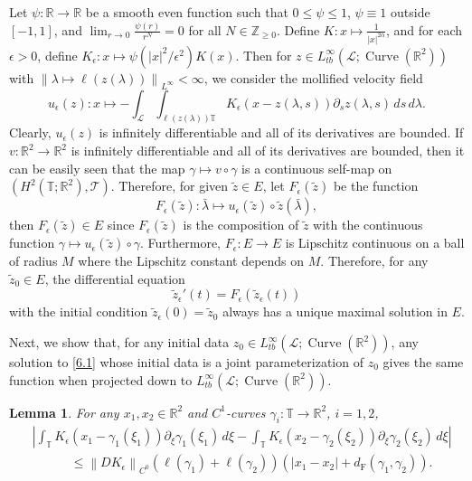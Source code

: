 \documentclass[reqno,centertags,12pt]{amsart}
\newtheorem{lemma}[theorem]{Lemma}
\theoremstyle{definition}
\numberwithin{equation}{section}
\newcommand{\abs}[1]{\left\lvert#1\right\rvert}
\newcommand{\norm}[1]{\left\|#1\right\|}
\newcommand{\bbR}{{\mathbb{R}}}
\newcommand{\bbZ}{{\mathbb{Z}}}
\newcommand{\bbT}{{\mathbb{T}}}
\begin{document}
Let $\psi\colon\bbR\to\bbR$ be a smooth even function such that $0\leq\psi\leq 1$,
$\psi\equiv 1$ outside $[-1,1]$, and $\lim_{r\to 0}\frac{\psi(r)}{r^{N}} = 0$
for all $N\in\bbZ_{\geq 0}$. Define $K\colon x\mapsto \frac{1}{\abs{x}^{2\alpha}}$,
and for each $\epsilon>0$, define
$K_{\epsilon}\colon x\mapsto \psi(\abs{x}^{2}/\epsilon^{2})K(x)$.
Then for $z\in L_{tb}^{\infty}(\mathcal{L};\operatorname{Curve}(\bbR^{2}))$
with $\norm{\lambda\mapsto\ell(z(\lambda))}_{L^{\infty}} < \infty$,
we consider the mollified velocity field
\[
    u_{\epsilon}(z) \colon x \mapsto
    - \int_{\mathcal{L}}\int_{\ell(z(\lambda))\bbT}
    K_{\epsilon}(x - z(\lambda,s))
    \partial_{s}z(\lambda,s)
    \,ds\,d\lambda.
\]
Clearly, $u_{\epsilon}(z)$ is infinitely differentiable and all of its derivatives
are bounded. If $v\colon\bbR^{2}\to\bbR^{2}$ is infinitely differentiable and all of its
derivatives are bounded, then it can be easily seen that the map
$\gamma\mapsto v\circ\gamma$ is a continuous self-map on
$(H^{2}(\bbT;\bbR^{2}),\mathscr{T})$. Therefore, for given $\tilde{z}\in E$,
let $F_{\epsilon}(\tilde{z})$ be the function
\[
    F_{\epsilon}(\tilde{z})\colon \bar{\lambda} \mapsto
    u_{\epsilon}(\tilde{z}) \circ \tilde{z}(\bar{\lambda}),
\]
then $F_{\epsilon}(\tilde{z})\in E$ since $F_{\epsilon}(\tilde{z})$
is the composition of $\tilde{z}$ with the continuous function
$\gamma\mapsto u_{\epsilon}(\tilde{z})\circ\gamma$.
Furthermore, $F_{\epsilon}\colon E\to E$ is Lipschitz continuous on
a ball of radius $M$ where the Lipschitz constant depends on $M$.
Therefore, for any $\tilde{z}_{0}\in E$, the differential equation
\begin{equation}\label{6.1}
    \tilde{z}_{\epsilon}'(t) = F_{\epsilon}(\tilde{z}_{\epsilon}(t))
\end{equation}
with the initial condition $\tilde{z}_{\epsilon}(0) = \tilde{z}_{0}$
always has a unique maximal solution in $E$.

Next, we show that, for any initial data
$z_{0}\in L_{tb}^{\infty}(\mathcal{L};\operatorname{Curve}(\bbR^{2}))$,
any solution to \eqref{6.1} whose initial data
is a joint parameterization of $z_{0}$ gives the same function when projected down to
$L_{tb}^{\infty}(\mathcal{L};\operatorname{Curve}(\bbR^{2}))$.

\begin{lemma}\label{L6.1}
    For any $x_{1},x_{2}\in\bbR^{2}$ and
    $C^{1}$-curves $\gamma_{i}\colon\bbT\to\bbR^{2}$, $i=1,2$,
    \begin{align*}
        &\abs{\int_{\bbT}K_{\epsilon}(x_{1} - \gamma_{1}(\xi_{1}))
        \partial_{\xi}\gamma_{1}(\xi_{1})\,d\xi
        - \int_{\bbT}K_{\epsilon}(x_{2} - \gamma_{2}(\xi_{2}))
        \partial_{\xi}\gamma_{2}(\xi_{2})\,d\xi}
        \\&\quad\quad\quad
        \leq \norm{DK_{\epsilon}}_{C^{0}}
        \left(\ell(\gamma_{1}) + \ell(\gamma_{2})\right)
        \left(
            \abs{x_{1} - x_{2}}
            + d_{\mathrm{F}}(\gamma_{1},\gamma_{2})
        \right).
    \end{align*}
\end{lemma}
\end{document}
